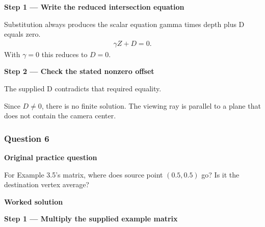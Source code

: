 \documentclass[letterpaper,11pt,english,openany,oneside]{jupyterBook}
\begin{document}
\par\medskip{}
{\color{QuizStepRed}\bfseries Step 1 — Write the reduced intersection equation}\par\smallskip

\sphinxAtStartPar
{} Substitution always produces the scalar equation gamma times depth plus D equals zero.
{\color{QuizMathBlue} \begin{equation*}
\begin{split}
\gamma Z+D=0.
\end{split}
\end{equation*}}
\sphinxAtStartPar
With {\color{QuizMathBlue} \(\gamma=0\)} this reduces to {\color{QuizMathBlue} \(D=0\)}.

\par

\par\medskip{}
{\color{QuizStepRed}\bfseries Step 2 — Check the stated nonzero offset}\par\smallskip

\sphinxAtStartPar
{} The supplied D contradicts that required equality.

\sphinxAtStartPar
Since {\color{QuizMathBlue} \(D\ne0\)}, there is no finite solution. The viewing ray is parallel to a plane that does not contain the camera center.

\par

\par\medskip


\subsubsection{Question 6}
\label{\detokenize{lectures/lecture03/tldr:question-6}}\label{\detokenize{lectures/lecture03/tldr:lec03-tldr-q6}}
\par\medskip\textbf{Original practice question}\par\smallskip

\sphinxAtStartPar
For Example 3.5’s matrix, where does source point \((0.5,0.5)\) go? Is it the destination vertex average?

\par\medskip

\par\medskip
\textbf{Worked solution}\par\smallskip

\par\medskip{}
{\color{QuizStepRed}\bfseries Step 1 — Multiply the supplied example matrix}\par\smallskip
\end{document}
